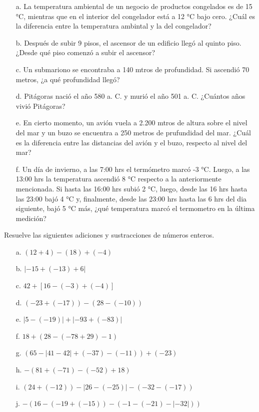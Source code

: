 \documentclass[spanish,letterpaper, 11pt, addpoints, answers]{exam}
\begin{document}
\begin{questions}
\begin{itemize}
  \item[a.] La temperatura ambiental de un negocio de productos congelados es de 15 °C, mientras que en el interior del congelador está a 12 °C bajo cero. ¿Cuál es la diferencia entre la temperatura ambintal y la del congelador?
  \item[b.] Después de subir 9 pisos, el ascensor de un edificio llegó al quinto piso. ¿Desde qué piso comenzó a subir el ascensor?
  \item[c.] Un submariono se encontraba a 140 mtros de profundidad. Si ascendió 70 metros, ¿a qué profundidad llegó?
  \item[d.] Pitágoras nació el año 580 a. C. y murió el año 501 a. C. ¿Cuántos años vivió Pitágoras?
  \item[e.] En cierto momento, un avión vuela a 2.200 mtros de altura sobre el nivel del mar y un buzo se encuentra a 250 metros de prufundidad del mar. ¿Cuál es la diferencia entre las distancias del avión y el buzo, respecto al nivel del mar?    
  \item[f.] Un día de invierno, a las 7:00 hrs el termómetro marcó -3 °C. Luego, a las 13:00 hrs la temperatura ascendió 8 °C respecto a la anteriormente mencionada. Si hasta las 16:00 hrs subió 2 °C, luego, desde las 16 hrs hasta las 23:00 bajó 4 °C y, finalmente, desde las 23:00 hrs hasta las 6 hrs del dia siguiente, bajó 5 °C más, ¿qué temperatura marcó el termometro en la última medición? 
\end{itemize}

\question Resuelve las siguientes adiciones y sustracciones de números enteros.

\begin{itemize}
  \item[a.] $(12+4)-(18)+(-4)$
  \item[b.] $|-15+(-13)+6|$
  \item[c.] $42+\left[16-(-3)+(-4)\right]$
  \item[d.] $\left(-23+(-17)\right)-\left(28-(-10)\right)$
  \item[e.] $\left|5-(-19)\right|+\left|-93+(-83)\right|$
  \item[f.] $18+\left(28-\left(-78+29\right)-1\right)$
  \item[g.] $\left(65-\left|41-42\right|+(-37)-(-11)\right)+(-23)$
  \item[h.] $-\left(81+(-71)-(-52)+18\right)$
  \item[i.] $\left(24+(-12)\right)-\left|26-(-25)\right|-\left(-32-(-17)\right)$
  \item[j.] $-\left(16-\left(-19+(-15)\right)-\left(-1-(-21)-|-32|\right)\right)$       
\end{itemize}


\end{questions}
\end{document}
